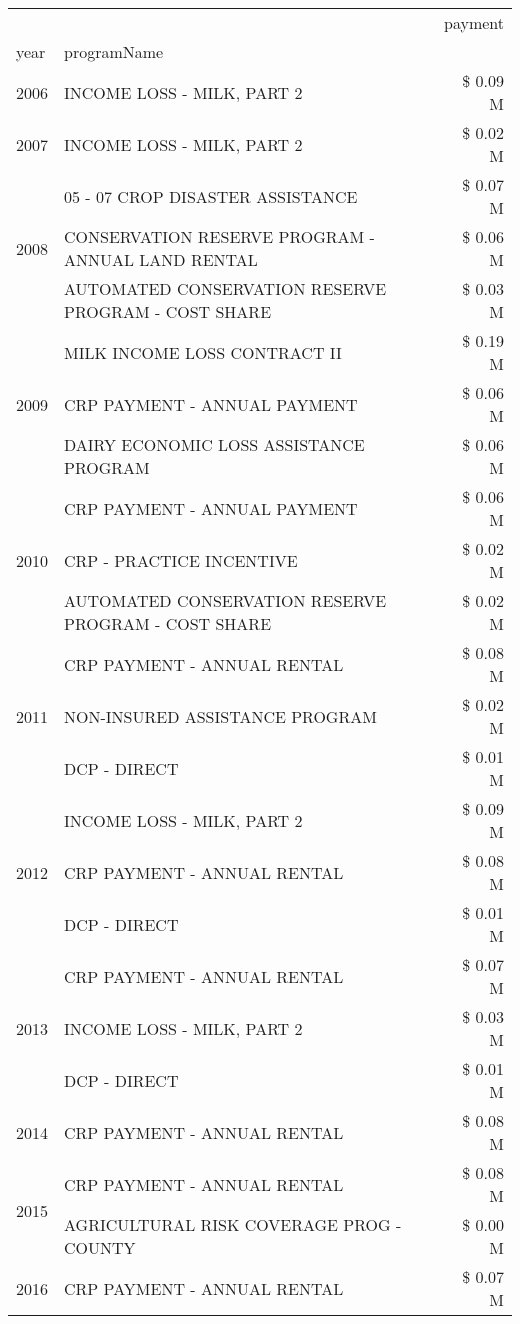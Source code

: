 \begin{tabular}{llr}
\toprule
 &  & payment \\
year & programName &  \\
\midrule
2006 & INCOME LOSS - MILK, PART 2 & \$ 0.09 M \\
\cline{1-3}
2007 & INCOME LOSS - MILK, PART 2 & \$ 0.02 M \\
\cline{1-3}
\multirow[t]{3}{*}{2008} & 05 - 07 CROP DISASTER ASSISTANCE & \$ 0.07 M \\
 & CONSERVATION RESERVE PROGRAM - ANNUAL LAND RENTAL & \$ 0.06 M \\
 & AUTOMATED CONSERVATION RESERVE PROGRAM - COST SHARE & \$ 0.03 M \\
\cline{1-3}
\multirow[t]{3}{*}{2009} & MILK INCOME LOSS CONTRACT II & \$ 0.19 M \\
 & CRP PAYMENT - ANNUAL PAYMENT & \$ 0.06 M \\
 & DAIRY ECONOMIC LOSS ASSISTANCE PROGRAM & \$ 0.06 M \\
\cline{1-3}
\multirow[t]{3}{*}{2010} & CRP PAYMENT - ANNUAL PAYMENT & \$ 0.06 M \\
 & CRP - PRACTICE INCENTIVE & \$ 0.02 M \\
 & AUTOMATED CONSERVATION RESERVE PROGRAM - COST SHARE & \$ 0.02 M \\
\cline{1-3}
\multirow[t]{3}{*}{2011} & CRP PAYMENT - ANNUAL RENTAL & \$ 0.08 M \\
 & NON-INSURED ASSISTANCE PROGRAM & \$ 0.02 M \\
 & DCP - DIRECT & \$ 0.01 M \\
\cline{1-3}
\multirow[t]{3}{*}{2012} & INCOME LOSS - MILK, PART 2 & \$ 0.09 M \\
 & CRP PAYMENT - ANNUAL RENTAL & \$ 0.08 M \\
 & DCP - DIRECT & \$ 0.01 M \\
\cline{1-3}
\multirow[t]{3}{*}{2013} & CRP PAYMENT - ANNUAL RENTAL & \$ 0.07 M \\
 & INCOME LOSS - MILK, PART 2 & \$ 0.03 M \\
 & DCP - DIRECT & \$ 0.01 M \\
\cline{1-3}
2014 & CRP PAYMENT - ANNUAL RENTAL & \$ 0.08 M \\
\cline{1-3}
\multirow[t]{2}{*}{2015} & CRP PAYMENT - ANNUAL RENTAL & \$ 0.08 M \\
 & AGRICULTURAL RISK COVERAGE PROG - COUNTY & \$ 0.00 M \\
\cline{1-3}
\multirow[t]{3}{*}{2016} & CRP PAYMENT - ANNUAL RENTAL & \$ 0.07 M \\

\end{tabular}
